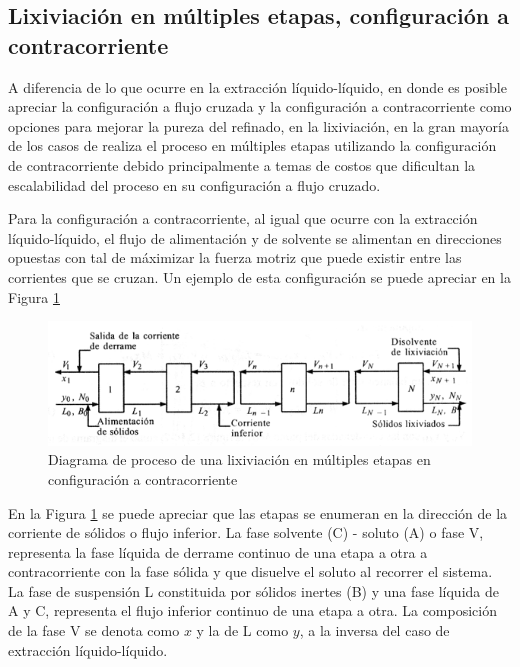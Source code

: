 \documentclass[11pt]{book}
\begin{document}
\subsection{Lixiviación en múltiples etapas, configuración a contracorriente}

A diferencia de lo que ocurre en la extracción líquido-líquido, en donde es posible apreciar la configuración a flujo cruzada y la configuración a contracorriente como opciones para mejorar la pureza del refinado, en la lixiviación, en la gran mayoría de los casos de realiza el proceso en múltiples etapas utilizando la configuración de contracorriente debido principalmente a temas de costos que dificultan la escalabilidad del proceso en su configuración a flujo cruzado.

Para la configuración a contracorriente, al igual que ocurre con la extracción líquido-líquido, el flujo de alimentación y de solvente se alimentan en direcciones opuestas con tal de máximizar la fuerza motriz que puede existir entre las corrientes que se cruzan. Un ejemplo de esta configuración se puede apreciar en la Figura \ref{fig:Lixiviacion_5}

\begin{figure}[H]
    \centering
    \includegraphics[width = 13 cm]{img/lixiviacion/EquilibrioLixiviacion_5.PNG}
    \caption{Diagrama de proceso de una lixiviación en múltiples etapas en configuración a contracorriente}
    \label{fig:Lixiviacion_5}
\end{figure}

En la Figura \ref{fig:Lixiviacion_5} se puede apreciar que las etapas se enumeran en la dirección de la corriente de sólidos o flujo inferior. La fase solvente (C) - soluto (A) o fase V, representa la fase líquida de derrame continuo de una etapa a otra a contracorriente con la fase sólida y que disuelve el soluto al recorrer el sistema. La fase de suspensión L constituida por sólidos inertes (B) y una fase líquida de A y C, representa el flujo inferior continuo de una etapa a otra. La composición de la fase V se denota como $x$ y la de L como $y$, a la inversa del caso de extracción líquido-líquido.
\end{document}

